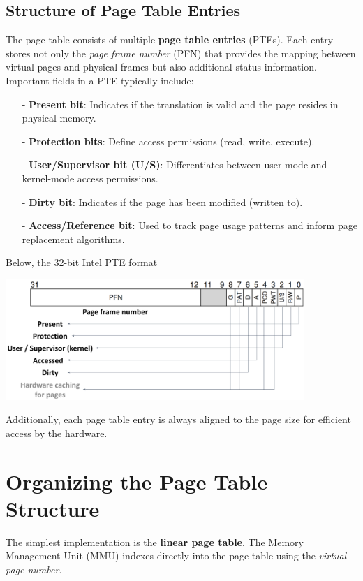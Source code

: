 \documentclass[../../compsys.tex]{subfiles}
\begin{document}
\subsection{Structure of Page Table Entries}
The page table consists of multiple \textbf{page table entries} (PTEs). Each entry stores not only the \textit{page frame number} (PFN) that provides the mapping between virtual pages and physical frames but also additional status information. Important fields in a PTE typically include:

\begin{itemize}
  \item[-] \textbf{Present bit}: Indicates if the translation is valid and the page resides in physical memory.
  \item[-] \textbf{Protection bits}: Define access permissions (read, write, execute).
  \item[-] \textbf{User/Supervisor bit (U/S)}: Differentiates between user-mode and kernel-mode access permissions.
  \item[-] \textbf{Dirty bit}: Indicates if the page has been modified (written to).
  \item[-] \textbf{Access/Reference bit}: Used to track page usage patterns and inform page replacement algorithms.
\end{itemize}
\newpage
Below, the 32-bit Intel PTE format
\begin{center}
  \includegraphics[width=0.85\textwidth]{chapters/L5/images/intel.png}
\end{center}

Additionally, each page table entry is always aligned to the page size for efficient access by the hardware.


\section{Organizing the Page Table Structure}

The simplest implementation is the \textbf{linear page table}. The Memory Management Unit (MMU) indexes directly into the page table using the \emph{virtual page number}.
\end{document}
